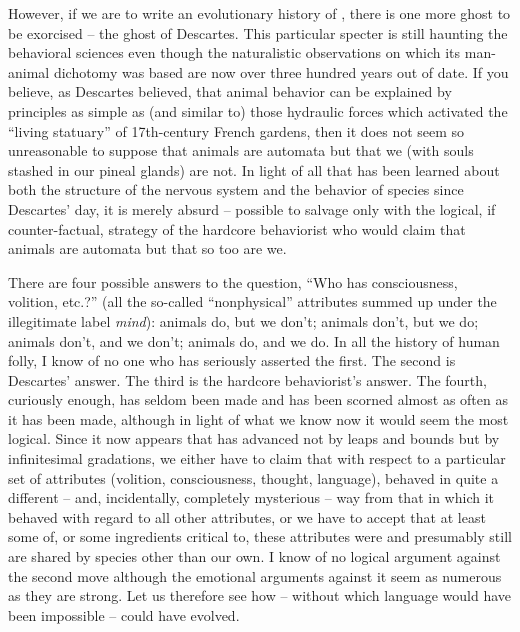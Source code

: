 However, if we are to write an evolutionary history of , there is one more ghost to be exorcised -- the ghost of Descartes. This particular specter is still haunting the behavioral sciences even though the naturalistic observations on which its man-animal dichotomy was based are now over three hundred years out of date. If you believe, as Descartes believed, that animal behavior can be explained by principles as simple as (and similar to) those hydraulic forces which activated the ``living statuary'' of 17th-century French gardens, then it does not seem so unreasonable to suppose that animals are automata but that we (with souls stashed in our pineal glands) are not. In light of all that has been learned about both the structure of the nervous system and the behavior of species since Descartes' day, it is merely absurd -- possible to salvage only with the logical, if counter-factual, strategy of the hardcore behaviorist who would claim that animals are automata but that so too are we.

There are four possible answers to the question, ``Who has consciousness, volition, etc.?'' (all the so-called ``nonphysical'' attributes summed up under the illegitimate label \textit{mind}): animals do, but we don't; animals don't, but we do; animals don't, and we don't; animals do, and we do. In all the history of human folly, I know of no one who has seriously asserted the first. The second is Descartes' answer. The third is the hardcore behaviorist's answer. The fourth, curiously enough, has seldom been made and has been scorned almost as often as it has been made, although in light of what we know now it would seem the most logical. Since it now appears that  has advanced not by leaps and bounds but by infinitesimal gradations, we either have to claim that with respect to a particular set of attributes (volition, consciousness, thought, language),  behaved in quite a different -- and, incidentally, completely mysterious -- way from that in which it behaved with regard to all other attributes, or we have to accept that at least some of, or some ingredients critical to, these attributes were and presumably still are shared by species other than our own. I know of no logical argument against the second move although the emotional arguments against it seem as numerous as they are strong. Let us therefore see how  -- without which language would have been impossible -- could have evolved.

